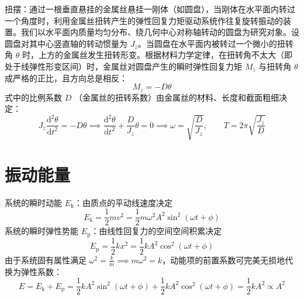 \documentclass[lang=cn,11pt]{elegantbook}
\begin{document}
\begin{definition}[扭摆]
扭摆：通过一根垂直悬挂的金属丝悬挂一刚体（如圆盘），当刚体在水平面内转过一个角度时，利用金属丝扭转产生的弹性回复力矩驱动系统作往复旋转振动的装置。我们以水平面内质量均匀分布、绕几何中心对称轴转动的圆盘为研究对象。设圆盘对其中心竖直轴的转动惯量为 $J_z$。当圆盘在水平面内被转过一个微小的扭转角 $\theta$ 时，上方的金属丝发生扭转形变。根据材料力学定律，在扭转角不太大（即处于线弹性形变区间）时，金属丝对圆盘产生的瞬时弹性回复力矩 $M_z$ 与扭转角 $\theta$ 成严格的正比，且方向总是相反：$$M_z = -D\theta$$式中的比例系数 $D$ （金属丝的扭转系数）由金属丝的材料、长度和截面粗细决定：$$J_z \frac{\mathrm{d}^2\theta}{\mathrm{d}t^2} = -D\theta \implies \frac{\mathrm{d}^2\theta}{\mathrm{d}t^2} + \frac{D}{J_z}\theta = 0\implies\boxed{\omega = \sqrt{\frac{D}{J_z}}, \qquad T = 2\pi\sqrt{\frac{J_z}{D}}}$$
\end{definition}

\section{振动能量}

\begin{definition}[动能与势能]
系统的瞬时动能 $E_{\text{k}}$：由质点的平动线速度决定$$E_{\text{k}} = \frac{1}{2}m v^2 = \frac{1}{2}m\omega^2 A^2 \sin^2(\omega t + \phi)$$系统的瞬时弹性势能 $E_{\text{p}}$：由线性回复力的空间空间积累决定$$E_{\text{p}} = \frac{1}{2}k x^2 = \frac{1}{2}k A^2 \cos^2(\omega t + \phi)$$由于系统固有属性满足 $\omega^2 = \frac{k}{m} \implies m\omega^2 = k$，动能项的前置系数可完美无损地代换为弹性系数：$$E = E_{\text{k}} + E_{\text{p}} = \frac{1}{2}k A^2 \sin^2(\omega t + \phi) + \frac{1}{2}k A^2 \cos^2(\omega t + \phi) =\frac{1}{2}k A^2 \propto A^2$$
\end{definition}
\end{document}
